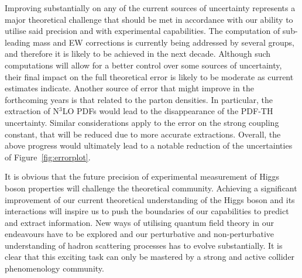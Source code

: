 \label{sec:hl-lhc-ggF}
Improving substantially on any of the current
sources of uncertainty represents a major theoretical challenge that
should be met in accordance with our ability to utilise said precision
and with experimental capabilities. 
The computation of sub-leading mass and EW corrections is
currently being addressed by several groups, and therefore it is
likely to be achieved in the next decade. Although such computations
will allow for a better control over some sources of uncertainty,
their final impact on the full theoretical error is likely to be
moderate as current estimates indicate.
Another source of error that might improve in the forthcoming years is
that related to the parton densities. In particular, the extraction of
N$^3$LO PDFs would lead to the disappearance of the PDF-TH
uncertainty. Similar considerations apply to the error on the strong
coupling constant, that will be reduced due to more accurate
extractions. Overall, the above progress would ultimately lead to a
notable reduction of the uncertainties of Figure~\ref{fig:errorplot}.

It is obvious that the future precision of experimental measurement of Higgs boson properties will challenge the theoretical community.
Achieving a significant improvement of our current theoretical understanding of the Higgs boson and its interactions will inspire us to push the boundaries of our capabilities to predict and extract information.
New ways of utilising quantum field theory in our endeavours have to be explored and our perturbative and non-perturbative understanding of hadron scattering processes has to evolve substantially. 
It is clear that this exciting task can only be mastered by a strong and active collider phenomenology community.
 

\label{sec:hl-lhc-VBF}

